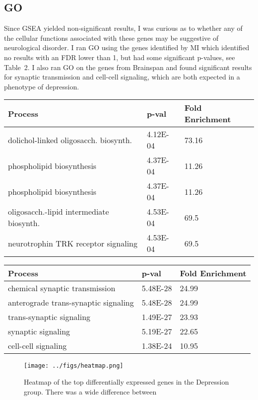 \documentclass{bioinfo}
\begin{document}
\subsection{GO}
Since GSEA yielded non-significant results, I was curious as to whether any of the cellular functions associated with these genes may be suggestive of neurological disorder.  I ran GO using the genes identified by MI which identified no results with an FDR lower than 1, but had some significant p-values, see Table~2\vphantom{\ref{Tab:02}}.  I also ran GO on the genes from Brainspan and found significant results for synaptic transmission and cell-cell signaling, which are
both expected in a phenotype of depression. 
\begin{table}[!t]
     {\begin{tabular}{@{}lll@{}}
Process&	p-val&	Fold Enrichment\\\hline
dolichol-linked oligosacch. biosynth. & 4.12E-04& 73.16\\
phospholipid biosynthesis & 4.37E-04& 11.26\\
phospholipid biosynthesis & 4.37E-04& 11.26\\
oligosacch.-lipid intermediate biosynth. & 4.53E-04 & 69.5 \\
neurotrophin TRK receptor signaling & 4.53E-04 & 69.5 \\
\end{tabular}}{}
\end{table}
\begin{table}[!t]
     {\begin{tabular}{@{}lll@{}}
Process&	p-val&	Fold Enrichment\\\hline
chemical synaptic transmission & 	5.48E-28 & 24.99 \\
anterograde trans-synaptic signaling&  	5.48E-28 & 24.99 \\
trans-synaptic signaling&  	1.49E-27& 23.93 \\
synaptic signaling & 	5.19E-27 & 22.65\\
cell-cell signaling &  	1.38E-24& 10.95 \\
\end{tabular}}{}
\end{table}
\begin{figure*}[tbp!]%
    \centering
    \texttt{[image: ../figs/heatmap.png]}
    \caption{Heatmap of the top differentially expressed genes in the Depression group.  There was a wide difference between }\label{fig:04}
\end{figure*}
\end{document}
